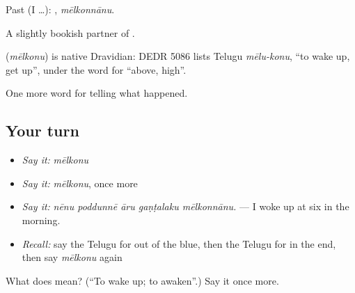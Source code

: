 Past (I …): , \emph{mēlkonnānu}.

A slightly bookish partner of  .

\begin{cousinweb}
\textbf{} (\emph{mēlkonu}) is native Dravidian: DEDR 5086 lists Telugu \emph{mēlu-konu}, \textquotedblleft{}to wake up, get up\textquotedblright{}, under the word for \textquotedblleft{}above, high\textquotedblright{}.
\end{cousinweb}

\begin{grammarlens}[title={What you've built}]
One more word for telling what happened.
\end{grammarlens}

\subsection*{Your turn}
\begin{itemize}
\raggedright
  \item \emph{Say it:} \emph{mēlkonu}
  \item \emph{Say it:} \emph{mēlkonu}, once more
  \item \emph{Say it:} \emph{nēnu poddunnē āru gaṇṭalaku mēlkonnānu.} — I woke up at six in the morning.
  \item \emph{Recall:} say the Telugu for out of the blue, then the Telugu for in the end, then say \emph{mēlkonu} again
\end{itemize}

\begin{tcolorbox}[breakable,colback=teal!4,colframe=teal!35!black,title={Before you move on}]
What does  mean? (\textquotedblleft{}To wake up; to awaken\textquotedblright{}.) Say it once more.
\end{tcolorbox}
